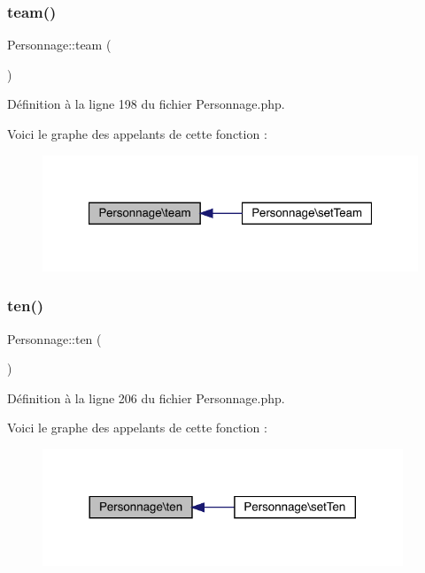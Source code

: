 \subsubsection{\texorpdfstring{team()}{team()}}
{\footnotesize\ttfamily Personnage\+::team (\begin{DoxyParamCaption}{ }\end{DoxyParamCaption})}



Définition à la ligne 198 du fichier Personnage.\+php.

Voici le graphe des appelants de cette fonction \+:\nopagebreak
\begin{figure}[H]
\begin{center}
\leavevmode
\includegraphics[width=321pt]{class_personnage_a0d4c73464508133a5e83f3e53085572c_icgraph}
\end{center}
\end{figure}
\mbox{\label{class_personnage_ad7dba2392c000b18cdf4545c4659e972}} 
\subsubsection{\texorpdfstring{ten()}{ten()}}
{\footnotesize\ttfamily Personnage\+::ten (\begin{DoxyParamCaption}{ }\end{DoxyParamCaption})}



Définition à la ligne 206 du fichier Personnage.\+php.

Voici le graphe des appelants de cette fonction \+:\nopagebreak
\begin{figure}[H]
\begin{center}
\leavevmode
\includegraphics[width=305pt]{class_personnage_ad7dba2392c000b18cdf4545c4659e972_icgraph}
\end{center}
\end{figure}
\mbox{\label{class_personnage_a5fbe8f1f41e05e856ec6390bfb3e4f03}} 
